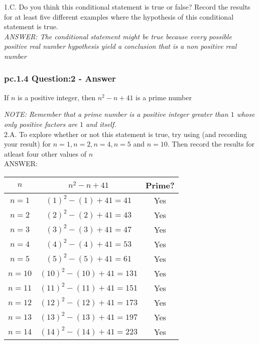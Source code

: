 1.C. Do you think this conditional statement is true or false? Record the results for at least five different examples where the hypothesis of this conditional statement is true. \\
{\it ANSWER: The conditional statement might be true because every possible positive real number hypothesis yield a conclusion that is a non positive real number } \\

\subsubsection*{pc.1.4 Question:2 - Answer}

\begin{tcolorbox}
\begin{theorem}
If $n$ is a positive integer, then $n^2 - n +41$ is a prime number
\end{theorem}
\end{tcolorbox}

{\it NOTE: Remember that a prime number is a positive integer greater than $1$ whose only positive factors are $1$ and itself.} \\

2.A. To explore whether or not this statement is true, try using (and recording your result) for $n=1, n=2, n=4, n=5$ and $n=10$. Then record the results for atleast four other values of $n$ \\

ANSWER: \\
\begin{center}
\begin{tabular}{|c|c|c|}
\hline 
$n$ & $n^2 - n +41$ & Prime? \\ 
\hline 
$n=1$ & $(1)^2-(1)+41 = 41$ & Yes \\ 
\hline 
$n=2$ & $(2)^2-(2)+41 = 43$ & Yes \\
\hline 
$n=3$ & $(3)^2-(3)+41 = 47$ & Yes \\
\hline 
$n=4$ & $(4)^2-(4)+41 = 53$ & Yes \\
\hline 
$n=5$ & $(5)^2-(5)+41 = 61$ & Yes \\
\hline 
$n=10$ & $(10)^2-(10)+41 = 131$ & Yes \\
\hline 
$n=11$ & $(11)^2-(11)+41 = 151$ & Yes \\
\hline 
$n=12$ & $(12)^2-(12)+41 = 173$ & Yes \\
\hline 
$n=13$ & $(13)^2-(13)+41 = 197$ & Yes \\
\hline 
$n=14$ & $(14)^2-(14)+41 = 223$ & Yes \\
\hline 
\end{tabular} 
\end{center}

